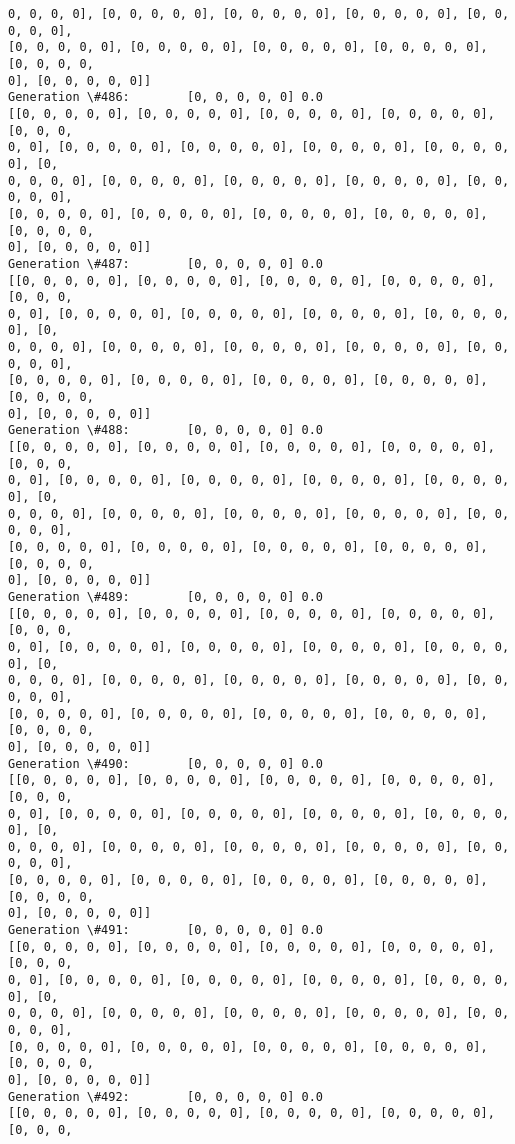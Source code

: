 \documentclass[11pt]{article}
\begin{document}
\begin{Verbatim}[commandchars=\\\{\}]
0, 0, 0, 0], [0, 0, 0, 0, 0], [0, 0, 0, 0, 0], [0, 0, 0, 0, 0], [0, 0, 0, 0, 0],
[0, 0, 0, 0, 0], [0, 0, 0, 0, 0], [0, 0, 0, 0, 0], [0, 0, 0, 0, 0], [0, 0, 0, 0,
0], [0, 0, 0, 0, 0]]
Generation \#486:        [0, 0, 0, 0, 0] 0.0
[[0, 0, 0, 0, 0], [0, 0, 0, 0, 0], [0, 0, 0, 0, 0], [0, 0, 0, 0, 0], [0, 0, 0,
0, 0], [0, 0, 0, 0, 0], [0, 0, 0, 0, 0], [0, 0, 0, 0, 0], [0, 0, 0, 0, 0], [0,
0, 0, 0, 0], [0, 0, 0, 0, 0], [0, 0, 0, 0, 0], [0, 0, 0, 0, 0], [0, 0, 0, 0, 0],
[0, 0, 0, 0, 0], [0, 0, 0, 0, 0], [0, 0, 0, 0, 0], [0, 0, 0, 0, 0], [0, 0, 0, 0,
0], [0, 0, 0, 0, 0]]
Generation \#487:        [0, 0, 0, 0, 0] 0.0
[[0, 0, 0, 0, 0], [0, 0, 0, 0, 0], [0, 0, 0, 0, 0], [0, 0, 0, 0, 0], [0, 0, 0,
0, 0], [0, 0, 0, 0, 0], [0, 0, 0, 0, 0], [0, 0, 0, 0, 0], [0, 0, 0, 0, 0], [0,
0, 0, 0, 0], [0, 0, 0, 0, 0], [0, 0, 0, 0, 0], [0, 0, 0, 0, 0], [0, 0, 0, 0, 0],
[0, 0, 0, 0, 0], [0, 0, 0, 0, 0], [0, 0, 0, 0, 0], [0, 0, 0, 0, 0], [0, 0, 0, 0,
0], [0, 0, 0, 0, 0]]
Generation \#488:        [0, 0, 0, 0, 0] 0.0
[[0, 0, 0, 0, 0], [0, 0, 0, 0, 0], [0, 0, 0, 0, 0], [0, 0, 0, 0, 0], [0, 0, 0,
0, 0], [0, 0, 0, 0, 0], [0, 0, 0, 0, 0], [0, 0, 0, 0, 0], [0, 0, 0, 0, 0], [0,
0, 0, 0, 0], [0, 0, 0, 0, 0], [0, 0, 0, 0, 0], [0, 0, 0, 0, 0], [0, 0, 0, 0, 0],
[0, 0, 0, 0, 0], [0, 0, 0, 0, 0], [0, 0, 0, 0, 0], [0, 0, 0, 0, 0], [0, 0, 0, 0,
0], [0, 0, 0, 0, 0]]
Generation \#489:        [0, 0, 0, 0, 0] 0.0
[[0, 0, 0, 0, 0], [0, 0, 0, 0, 0], [0, 0, 0, 0, 0], [0, 0, 0, 0, 0], [0, 0, 0,
0, 0], [0, 0, 0, 0, 0], [0, 0, 0, 0, 0], [0, 0, 0, 0, 0], [0, 0, 0, 0, 0], [0,
0, 0, 0, 0], [0, 0, 0, 0, 0], [0, 0, 0, 0, 0], [0, 0, 0, 0, 0], [0, 0, 0, 0, 0],
[0, 0, 0, 0, 0], [0, 0, 0, 0, 0], [0, 0, 0, 0, 0], [0, 0, 0, 0, 0], [0, 0, 0, 0,
0], [0, 0, 0, 0, 0]]
Generation \#490:        [0, 0, 0, 0, 0] 0.0
[[0, 0, 0, 0, 0], [0, 0, 0, 0, 0], [0, 0, 0, 0, 0], [0, 0, 0, 0, 0], [0, 0, 0,
0, 0], [0, 0, 0, 0, 0], [0, 0, 0, 0, 0], [0, 0, 0, 0, 0], [0, 0, 0, 0, 0], [0,
0, 0, 0, 0], [0, 0, 0, 0, 0], [0, 0, 0, 0, 0], [0, 0, 0, 0, 0], [0, 0, 0, 0, 0],
[0, 0, 0, 0, 0], [0, 0, 0, 0, 0], [0, 0, 0, 0, 0], [0, 0, 0, 0, 0], [0, 0, 0, 0,
0], [0, 0, 0, 0, 0]]
Generation \#491:        [0, 0, 0, 0, 0] 0.0
[[0, 0, 0, 0, 0], [0, 0, 0, 0, 0], [0, 0, 0, 0, 0], [0, 0, 0, 0, 0], [0, 0, 0,
0, 0], [0, 0, 0, 0, 0], [0, 0, 0, 0, 0], [0, 0, 0, 0, 0], [0, 0, 0, 0, 0], [0,
0, 0, 0, 0], [0, 0, 0, 0, 0], [0, 0, 0, 0, 0], [0, 0, 0, 0, 0], [0, 0, 0, 0, 0],
[0, 0, 0, 0, 0], [0, 0, 0, 0, 0], [0, 0, 0, 0, 0], [0, 0, 0, 0, 0], [0, 0, 0, 0,
0], [0, 0, 0, 0, 0]]
Generation \#492:        [0, 0, 0, 0, 0] 0.0
[[0, 0, 0, 0, 0], [0, 0, 0, 0, 0], [0, 0, 0, 0, 0], [0, 0, 0, 0, 0], [0, 0, 0,

\end{Verbatim}
\end{document}
